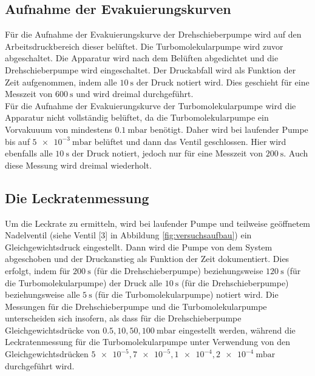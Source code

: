 \subsection{Aufnahme der Evakuierungskurven}
\label{subsec:evakkurven}
Für die Aufnahme der Evakuierungskurve der Drehschieberpumpe wird auf den Arbeitsdruckbereich
dieser belüftet. Die Turbomolekularpumpe wird zuvor abgeschaltet. Die Apparatur wird nach
dem Belüften abgedichtet und die Drehschieberpumpe wird eingeschaltet. Der Druckabfall
wird als Funktion der Zeit aufgenommen, indem alle $\SI{10}{\second}$ der Druck notiert wird.
Dies geschieht für eine Messzeit von $\SI{600}{\second}$ und wird dreimal durchgeführt.\\
Für die Aufnahme der Evakuierungskurve der Turbomolekularpumpe wird die Apparatur nicht vollständig
belüftet, da die Turbomolekularpumpe ein Vorvakuuum von mindestens $\SI{0.1}{\milli\bar}$ benötigt.
Daher wird bei laufender Pumpe bis auf
$\SI{5e-3}{\milli\bar}$ belüftet und dann das Ventil geschlossen. Hier wird ebenfalls alle
$\SI{10}{\second}$ der Druck notiert, jedoch nur für eine Messzeit von $\SI{200}{\second}$.
Auch diese Messung wird dreimal wiederholt.

\subsection{Die Leckratenmessung}
\label{subsec:leckratenm}
Um die Leckrate zu ermitteln, wird bei laufender Pumpe und teilweise geöffnetem Nadelventil
(siehe Ventil [3] in Abbildung \ref{fig:versuchsaufbau})
ein Gleichgewichtsdruck eingestellt. Dann wird die Pumpe von dem System abgeschoben und der
Druckanstieg als Funktion der Zeit dokumentiert. Dies erfolgt, indem für $\SI{200}{\second}$
(für die Drehschieberpumpe) beziehungsweise $\SI{120}{\second}$ (für die Turbomolekularpumpe)
der Druck alle $\SI{10}{\second}$ (für die Drehschieberpumpe) beziehungsweise alle $\SI{5}{\second}$
(für die Turbomolekularpumpe) notiert wird. Die Messungen für die Drehschieberpumpe und die
Turbomolekularpumpe unterscheiden sich insofern, als dass für die Drehschieberpumpe Gleichgewichtsdrücke
von $\num{0.5}, \num{10}, \num{50}, \SI{100}{\milli\bar}$ eingestellt werden, während die
Leckratenmessung für die Turbomolekularpumpe unter Verwendung von den Gleichgewichtsdrücken
$\num{5e-5}, \num{7e-5}, \num{1e-4}, \SI{2e-4}{\milli\bar}$ durchgeführt wird.
